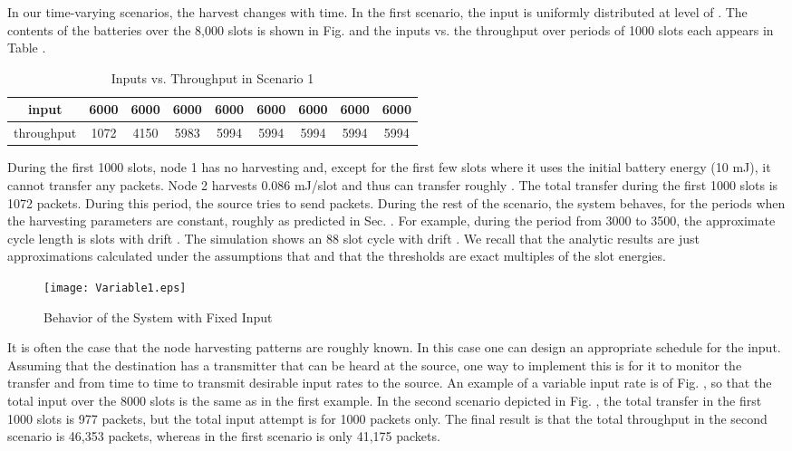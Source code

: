 \documentclass[12 pt]{article}
\newcommand{\debug}[1]{\mbox{\tt #1}}
\renewcommand{\debug}[1]{}              \newcommand{\cmd}[1]{}
\begin{document}
In our time-varying scenarios, the harvest changes with time.  In the first scenario, the input is uniformly distributed at level of .  The contents of the batteries over the 8,000 slots is shown in Fig.  and the inputs vs. the throughput over periods of 1000 slots each appears in Table .

\begin{table}[hbtp]
\begin{center}
\begin{tabular}{|c|c|c|c|c|c|c|c|c|}
  \hline
input &  6000 & 6000 &  6000 &  6000& 6000 & 6000  & 6000  & 6000  \\ \hline
throughput & 1072 & 4150 &  5983 & 5994 & 5994  & 5994 & 5994 & 5994  \\ \hline


\end{tabular}
\caption{Inputs vs. Throughput in Scenario 1\debug{\fbox{Table-Thru1}}\label{Table-Thru1}}
\end{center}
\end{table}


During the first 1000 slots, node 1 has no harvesting and, except for the first few slots where it uses the initial battery energy (10 mJ), it cannot transfer any packets.  Node 2 harvests 0.086 mJ/slot and thus can transfer roughly .
The total transfer during the first 1000 slots is 1072 packets.  During this period, the source tries to send  packets.
During the rest of the scenario, the system behaves, for the periods when the harvesting parameters are constant, roughly as predicted in Sec. .
For example, during the period from 3000 to 3500, the approximate cycle length is  slots with drift
.  The simulation shows an 88 slot cycle with drift .  We recall that the analytic results are just approximations calculated under the assumptions that  and that the thresholds are exact multiples of the slot energies.

\begin{figure}[hbtp]
\begin{center}
\texttt{[image: Variable1.eps]}
\caption{Behavior of the System with Fixed Input \debug{\fbox{fig-Variable1}}\label{fig-Variable1}}
\end{center}
\end{figure}


It is often the case that the node harvesting patterns are roughly known.  In this case one can design an appropriate schedule for the input.  Assuming that the destination has a transmitter that can be heard at the source, one way to implement this is for it to monitor the transfer and from time to time to transmit desirable input rates to the source.  An example of a variable input rate is  of Fig. , so that the total input over the 8000 slots is the same as in the first example.  In the second scenario depicted in Fig. , the total transfer in the first 1000 slots is 977 packets, but the total input attempt is for 1000 packets only.  The final result is that the total throughput in the second scenario is 46,353 packets, whereas in the first scenario is only 41,175 packets.
\end{document}
